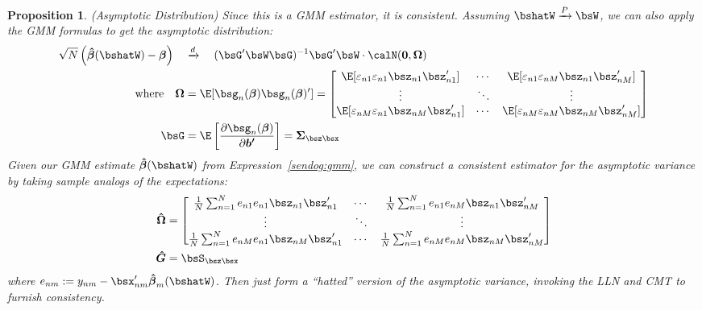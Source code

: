 \documentclass[12pt]{article}
\theoremstyle{plain}
\newtheorem{prop}[thm]{Proposition}
\theoremstyle{definition}
\theoremstyle{remark}
\newcommand{\bsSigma}{\boldsymbol{\Sigma}}
\newcommand{\bsbeta}{\boldsymbol{\beta}}
\newcommand{\bshatG}{\boldsymbol{\hat{G}}}
\newcommand{\bsOmega}{\boldsymbol{\Omega}}
\newcommand{\bshatbeta}{\boldsymbol{\hat{\beta}}}
\newcommand{\bshatOmega}{\boldsymbol{\hat{\Omega}}}
\renewcommand{\bso}{\boldsymbol{0}}
\newcommand{\bsbp}{\boldsymbol{b'}}
\newcommand{\Var}{\operatorname{Var}}
\newcommand{\pto}{\xrightarrow{P}}
\newcommand{\dto}{\xrightarrow{d}}
\newcommand{\sumnN}{\sum^N_{n=1}}
\begin{document}
\begin{prop}\emph{(Asymptotic Distribution)}
\label{prop:multgmmasymptotics}
Since this is a GMM estimator, it is consistent. Assuming
$\bshatW\pto\bsW$, we can also apply the GMM formulas to get the
asymptotic distribution:
\begin{align*}
  \sqrt{N}\left(\bshatbeta(\bshatW) - \bsbeta\right)
  \quad &\dto \quad
  (\bsG'\bsW\bsG)^{-1}\bsG'\bsW\cdot
  \calN(\bso,\bsOmega) \\
  \text{where}\quad
  \bsOmega &=
    \E[\bsg_n(\bsbeta)\bsg_n(\bsbeta)']
    =
    \begin{bmatrix}
      \E[\varepsilon_{n1}\varepsilon_{n1}\bsz_{n1}\bsz_{n1}']
      &\cdots &
      \E[\varepsilon_{n1}\varepsilon_{nM}\bsz_{n1}\bsz_{nM}']
      \\
      \vdots & \ddots & \vdots
      \\
      \E[\varepsilon_{nM}\varepsilon_{n1}\bsz_{nM}\bsz_{n1}']
      &\cdots &
      \E[\varepsilon_{nM}\varepsilon_{nM}\bsz_{nM}\bsz_{nM}']
    \end{bmatrix}
  \\
  \bsG &=
  \E\left[
    \frac{\partial \bsg_n(\bsbeta)}{\partial \bsbp}
  \right]
  =
  \bsSigma_{\bsz\bsx}
\end{align*}
Given our GMM estimate $\bshatbeta(\bshatW)$ from
Expression~\ref{sendog:gmm}, we can construct a consistent estimator for
the asymptotic variance by taking sample analogs of the expectations:
\begin{align}
  \bshatOmega &=
  \begin{bmatrix}
    \frac{1}{N}\sumnN e_{n1}e_{n1}\bsz_{n1}\bsz_{n1}'
    &\cdots &
    \frac{1}{N}\sumnN e_{n1}e_{nM}\bsz_{n1}\bsz_{nM}'
    \\
    \vdots & \ddots & \vdots
    \\
    \frac{1}{N}\sumnN e_{nM}e_{n1}\bsz_{nM}\bsz_{n1}'
    &\cdots &
    \frac{1}{N}\sumnN e_{nM}e_{nM}\bsz_{nM}\bsz_{nM}'
  \end{bmatrix}
  \label{mgmm:omegahat}
  \\
  \bshatG
  &=
  \bsS_{\bsz\bsx}
  \notag
\end{align}
where $e_{nm} := y_{nm} - \bsx_{nm}'\bshatbeta_m(\bshatW)$.
Then just form a ``hatted'' version of the asymptotic variance, invoking
the LLN and CMT to furnish consistency.
\end{prop}
\end{document}
